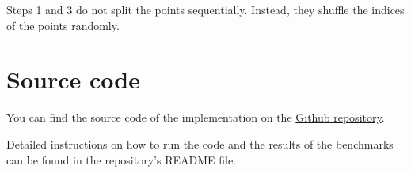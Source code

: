\documentclass{article}
\begin{document}
Steps 1 and 3 do not split the points sequentially. Instead, they shuffle the indices of the points randomly.

\section{Source code}
You can find the source code of the implementation on the 
\href{https://github.com/NontasBak/auth-parallel-ex1}{Github repository}. 

Detailed instructions on how to run the code and the results of the benchmarks can be found in the repository's README file.
\end{document}
